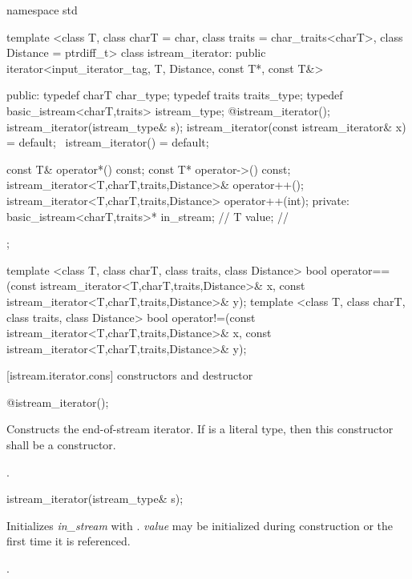 \begin{codeblock}
namespace std {
  template <class T, class charT = char, class traits = char_traits<charT>,
      class Distance = ptrdiff_t>
  class istream_iterator:
    public iterator<input_iterator_tag, T, Distance, const T*, const T&> {
  public:
    typedef charT char_type;
    typedef traits traits_type;
    typedef basic_istream<charT,traits> istream_type;
    @\seebelow@ istream_iterator();
    istream_iterator(istream_type& s);
    istream_iterator(const istream_iterator& x) = default;
   ~istream_iterator() = default;

    const T& operator*() const;
    const T* operator->() const;
    istream_iterator<T,charT,traits,Distance>& operator++();
    istream_iterator<T,charT,traits,Distance>  operator++(int);
  private:
    basic_istream<charT,traits>* in_stream; // \expos
    T value;                                // \expos
  };

  template <class T, class charT, class traits, class Distance>
    bool operator==(const istream_iterator<T,charT,traits,Distance>& x,
            const istream_iterator<T,charT,traits,Distance>& y);
  template <class T, class charT, class traits, class Distance>
    bool operator!=(const istream_iterator<T,charT,traits,Distance>& x,
            const istream_iterator<T,charT,traits,Distance>& y);
}
\end{codeblock}

[istream.iterator.cons]{ constructors and destructor}


%
\begin{itemdecl}
@\seebelow@ istream_iterator();
\end{itemdecl}

\begin{itemdescr}
\pnum
\effects
Constructs the end-of-stream iterator. If  is a literal type, then this
constructor shall be a  constructor.

\pnum
\postcondition {}.
\end{itemdescr}


%
\begin{itemdecl}
istream_iterator(istream_type& s);
\end{itemdecl}

\begin{itemdescr}
\pnum
\effects
Initializes \textit{in_stream} with . \textit{value} may be initialized during
construction or the first time it is referenced.

\pnum
\postcondition {}.
\end{itemdescr}


